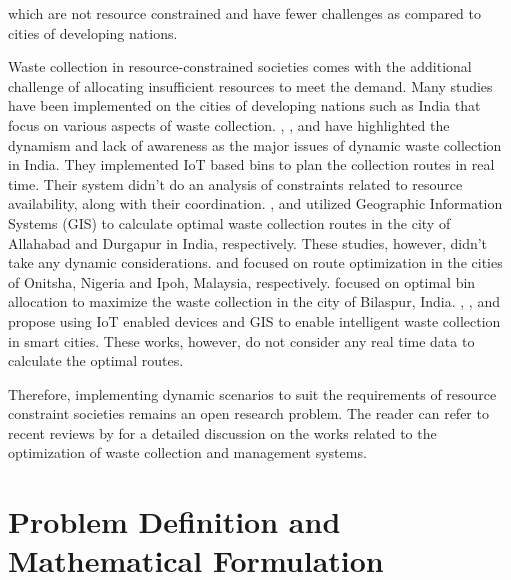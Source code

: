\documentclass[12pt]{article}
\begin{document}
which are not resource constrained and have fewer challenges as compared to cities of developing nations.

Waste collection in resource-constrained societies comes with the additional challenge of allocating insufficient resources to meet the demand. Many studies have been implemented on the cities of developing nations such as India that focus on various aspects of waste collection. \cite{dugdhe2016efficient}, \cite{chaudhari2018solid}, and \cite{badve2020garbage} have highlighted the dynamism and lack of awareness as the major issues of dynamic waste collection in India. They implemented IoT based bins to plan the collection routes in real time. Their system didn't do an analysis of constraints related to resource availability, along with their coordination. \cite{chaudhary2019gis}, and \cite{sk2020optimal} utilized Geographic Information Systems (GIS) to calculate optimal waste collection routes in the city of Allahabad and Durgapur in India, respectively. These studies, however, didn't take any dynamic considerations.\cite{ogwueleke2009route} and \cite{malakahmad2014solid} focused on route optimization in the cities of Onitsha, Nigeria and Ipoh, Malaysia, respectively. \cite{rathore2020location} focused on optimal bin allocation to maximize the waste collection in the city of Bilaspur, India. \cite{vasagade2017dynamic}, \cite{medvedev2015waste}, and \cite{malapur2017iot} propose using IoT enabled devices and GIS to enable intelligent waste collection in smart cities. These works, however, do not consider any real time data to calculate the optimal routes.

Therefore, implementing dynamic scenarios to suit the requirements of resource constraint societies remains an open research problem. The reader can refer to recent reviews by \cite{belien2014municipal,sulemana2018optimal,abdallah2020artificial} for a detailed discussion on the works related to the optimization of waste collection and management systems.




\section{Problem Definition and Mathematical Formulation}
\end{document}
